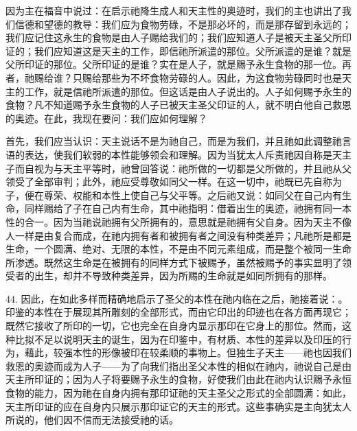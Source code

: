因为主在福音中说过：在启示祂降生成人和天主性的奥迹时，我们的主也讲出了我们信德和望德的教导：我们应为食物劳碌，不是那必坏的，而是那存留到永远的；我们应记住这永生的食物是由人子赐给我们的；我们应知道人子是被天主圣父所印证的；我们应知道这是天主的工作，即信祂所派遣的那位。父所派遣的是谁？就是父所印证的那位。父所印证的是谁？实在是人子，就是赐予永生食物的那一位。再者，祂赐给谁？只赐给那些为不坏食物劳碌的人。因此，为这食物劳碌同时也是天主的工作，就是信祂所派遣的那位。但这话是由人子说出的。人子如何赐予永生的食物？凡不知道赐予永生食物的人子已被天主圣父印证的人，就不明白他自己救恩的奥迹。在此，我现在要问：我们应如何理解？\par

首先，我们应当认识：天主说话不是为祂自己，而是为我们，并且祂如此调整祂言语的表达，使我们软弱的本性能够领会和理解。因为当犹太人斥责祂因自称是天主子而自视为与天主平等时，祂曾回答说：祂所做的一切都是父所做的，并且祂从父领受了全部审判；此外，祂应受尊敬如同父一样。在这一切中，祂既已先自称为子，便在尊荣、权能和本性上使自己与父平等。之后祂又说：如同父在自己内有生命，同样赐给了子在自己内有生命，其中祂指明：借着出生的奥迹，祂拥有同一本性的合一。因为当祂说祂拥有父所拥有的，意思就是祂拥有父自身。因为天主不像人一样是由复合而成，在祂内拥有者和被拥有者之间没有种类差异；凡祂所是都是生命，一个圆满、绝对、无限的本性，不是由不同元素组成，而是整个被同一生命所渗透。既然这生命是在被拥有的同样方式下被赐予，虽然被赐予的事实显明了领受者的出生，却并不导致种类差异，因为所赐的生命就是如同所拥有的那样。\par

44. 因此，在如此多样而精确地启示了圣父的本性在祂内临在之后，祂接着说：。 印鉴的本性在于展现其所雕刻的全部形式，而由它印出的印迹也在各方面再现它；既然它接收了所印的一切，它也完全在自身内显示那印在它身上的那位。然而，这种比拟不足以说明天主的诞生，因为在印鉴中，有材质、本性的差异以及印压的行为，藉此，较强本性的形像被印在较柔顺的事物上。但独生子天主——祂也因我们救恩的奥迹而成为人子——为了向我们指出圣父本性的相似在祂内，祂说自己是由天主所印证的；因为人子将要赐予永生的食物，好使我们由此在祂内认识赐予永恒食物的能力，因为祂在自身内拥有那印证祂的天主圣父之形式的全部圆满：如此，天主所印证的应在自身内只展示那印证它的天主的形式。这些事确实是主向犹太人所说的，他们因不信而无法接受祂的话。\par

